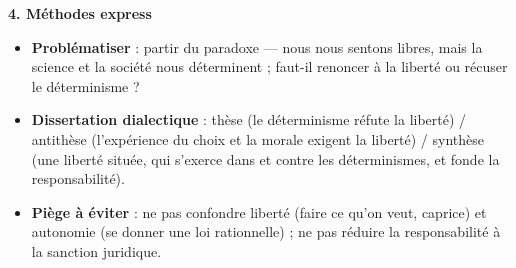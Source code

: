 \documentclass[11pt]{article}
\begin{document}
\begin{bilan}
\textbf{4. Méthodes express}
\begin{itemize}
  \item \textbf{Problématiser} : partir du paradoxe — nous nous sentons libres, mais la science et la société nous déterminent ; faut-il renoncer à la liberté ou récuser le déterminisme ?
  \item \textbf{Dissertation dialectique} : thèse (le déterminisme réfute la liberté) / antithèse (l'expérience du choix et la morale exigent la liberté) / synthèse (une liberté située, qui s'exerce dans et contre les déterminismes, et fonde la responsabilité).
  \item \textbf{Piège à éviter} : ne pas confondre liberté (faire ce qu'on veut, caprice) et autonomie (se donner une loi rationnelle) ; ne pas réduire la responsabilité à la sanction juridique.
\end{itemize}
\end{bilan}
\end{document}
